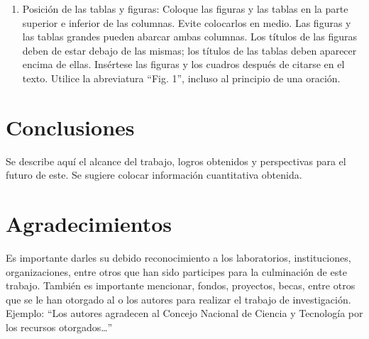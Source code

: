     
    
    \begin{enumerate}
        \item Posición de las tablas y figuras: Coloque las figuras y las tablas en la parte superior e inferior de las columnas. Evite colocarlos en medio. Las figuras y las tablas grandes pueden abarcar ambas columnas. Los títulos de las figuras deben de estar debajo de las mismas; los títulos de las tablas deben aparecer encima de ellas. Insértese las figuras y los cuadros después de citarse en el texto. Utilice la abreviatura “Fig. 1”, incluso al principio de una oración. 
    \end{enumerate}
    
    \section{Conclusiones}
    
    Se describe aquí el alcance del trabajo, logros obtenidos y perspectivas para el futuro de este. Se sugiere colocar información cuantitativa obtenida.
    
    \section{Agradecimientos}
    
    Es importante darles su debido reconocimiento a los laboratorios, instituciones, organizaciones, entre otros que han sido participes para la culminación de este trabajo. También es importante mencionar, fondos, proyectos, becas, entre otros que se le han otorgado al o los autores para realizar el trabajo de investigación. Ejemplo: “Los autores agradecen al Concejo Nacional de Ciencia y Tecnología por los recursos otorgados…”
    
    
    

    
    
